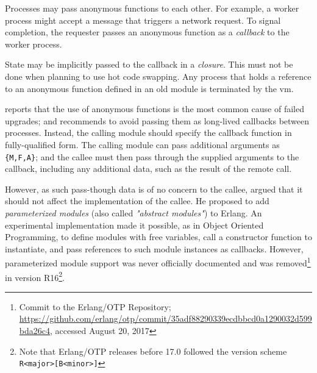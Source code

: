 Processes may pass anonymous functions to each other. For example, a worker process might accept a message that triggers a network request. To signal completion, the requester passes an anonymous function as a \emph{callback} to the worker process.

State may be implicitly passed to the callback in a \emph{closure}. This must not be done when planning to use hot code swapping. Any process that holds a reference to an anonymous function defined in an old module is terminated by the \acrshort{vm}.

\cite{davis:talk} reports that the use of anonymous functions is the most common cause of failed upgrades; and recommends to avoid passing them as long-lived callbacks between processes. Instead, the calling module should specify the callback function in fully-qualified form. The calling module can pass additional arguments as \lstinline|{M,F,A}|; and the callee must then pass through the supplied arguments to the callback, including any additional data, such as the result of the remote call.

However, as such pass-though data is of no concern to the callee, \cite{carlsson:parameterized} argued that it should not affect the implementation of the callee. He proposed to add \emph{parameterized modules} (also called \emph{"abstract modules"}) to Erlang. An experimental implementation made it possible, as in Object Oriented Programming, to define modules with free variables, call a constructor function to instantiate, and pass references to such module instances as callbacks.
However, parameterized module support was never officially documented and was removed\footnote{Commit to the Erlang/OTP Repository; \url{https://github.com/erlang/otp/commit/35adf88290339ecdbbcd0a1290032d599bda26c4}, accessed August 20, 2017} in version R16\footnote{Note that Erlang/OTP releases before 17.0 followed the version scheme \lstinline|R<major>[B<minor>]|}.
